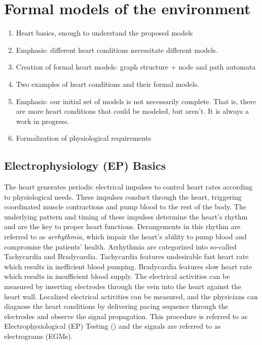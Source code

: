 \section{Formal models of the environment}
\label{formalModelsofEnv}

\begin{enumerate}
	\item Heart basics, enough to understand the proposed models
	\item Emphasis: different heart conditions necessitate different models.
	\item Creation of formal heart models: graph structure + node and path automata
	\item Two examples of heart conditions and their formal models.
	\item Emphasis: our initial set of models is not necessarily complete. That is, there are more heart conditions that could be modeled, but aren't. It is always a work in progress.		
	\item Formalization of physiological requirements
\end{enumerate}

\subsection{Electrophysiology (EP) Basics}
The heart generates periodic electrical impulses to control heart rates according to physiological needs. These impulses conduct through the heart, triggering coordinated muscle contractions and pump blood to the rest of the body. The underlying pattern and timing of these impulses determine the heart's rhythm and are the key to proper heart functions. Derangements in this rhythm are referred to as \emph{arrhythmia}, which impair the heart's ability to pump blood and compromise the patients' health. Arrhythmia are categorized into so-called \textsf{Tachycardia} and \textsf{Bradycardia}. Tachycardia features undesirable fast heart rate which results in inefficient blood pumping. Bradycardia features slow heart rate which results in insufficient blood supply. The electrical activities can be measured by inserting electrodes through the vein into the heart against the heart wall. Localized electrical activities can be measured, and the physicians can diagnose the heart conditions by delivering pacing sequence through the electrodes and observe the signal propagation. This procedure is referred to as Electrophysiological (EP) Testing  (\cite{josephson}) and the signals are referred to as electrograms (EGMs).

